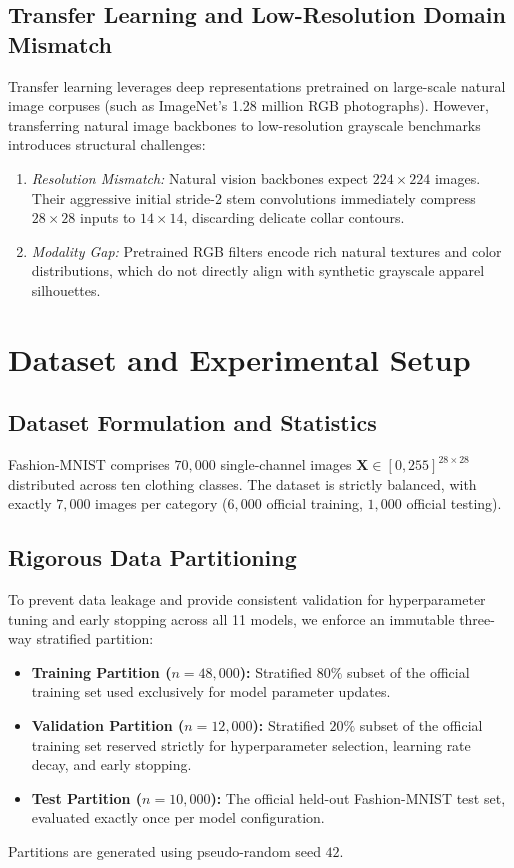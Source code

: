 \documentclass[conference]{IEEEtran}
\begin{document}
\subsection{Transfer Learning and Low-Resolution Domain Mismatch}
Transfer learning leverages deep representations pretrained on large-scale natural image corpuses (such as ImageNet's 1.28 million RGB photographs). However, transferring natural image backbones to low-resolution grayscale benchmarks introduces structural challenges:
\begin{enumerate}
    \item \emph{Resolution Mismatch:} Natural vision backbones expect $224\times224$ images. Their aggressive initial stride-2 stem convolutions immediately compress $28\times28$ inputs to $14\times14$, discarding delicate collar contours.
    \item \emph{Modality Gap:} Pretrained RGB filters encode rich natural textures and color distributions, which do not directly align with synthetic grayscale apparel silhouettes.
\end{enumerate}

\section{Dataset and Experimental Setup}\label{sec:data}

\subsection{Dataset Formulation and Statistics}
Fashion-MNIST comprises $70{,}000$ single-channel images $\mathbf{X} \in [0, 255]^{28 \times 28}$ distributed across ten clothing classes. The dataset is strictly balanced, with exactly $7{,}000$ images per category ($6{,}000$ official training, $1{,}000$ official testing).

\subsection{Rigorous Data Partitioning}
To prevent data leakage and provide consistent validation for hyperparameter tuning and early stopping across all 11 models, we enforce an immutable three-way stratified partition:
\begin{itemize}
    \item \textbf{Training Partition ($n=48{,}000$):} Stratified $80\%$ subset of the official training set used exclusively for model parameter updates.
    \item \textbf{Validation Partition ($n=12{,}000$):} Stratified $20\%$ subset of the official training set reserved strictly for hyperparameter selection, learning rate decay, and early stopping.
    \item \textbf{Test Partition ($n=10{,}000$):} The official held-out Fashion-MNIST test set, evaluated exactly once per model configuration.
\end{itemize}
Partitions are generated using pseudo-random seed $42$.
\end{document}
